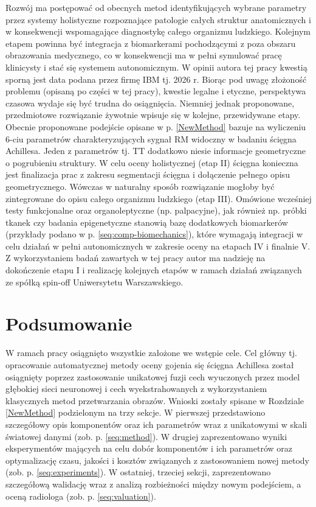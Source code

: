 Rozwój ma postępować od obecnych metod identyfikujących wybrane parametry przez systemy holistyczne rozpoznające patologie całych struktur anatomicznych \linebreak i w konsekwencji wspomagające diagnostykę całego organizmu ludzkiego. Kolejnym etapem powinna być integracja z biomarkerami pochodzącymi z poza obszaru obrazowania medycznego, co w konsekwencji ma w pełni symulować pracę klinicysty i stać się systemem autonomicznym. W opinii autora tej pracy kwestią sporną jest data podana przez firmę IBM tj. 2026 r. Biorąc pod uwagę złożoność problemu (opisaną po części w tej pracy), kwestie legalne i etyczne, perspektywa czasowa wydaje się być trudna do osiągnięcia. Niemniej jednak proponowane, przedmiotowe rozwiązanie żywotnie wpisuje się w kolejne, przewidywane etapy. Obecnie proponowane podejście opisane w p. \ref{NewMethod} bazuje na wyliczeniu 6-ciu parametrów charakteryzujących sygnał RM widoczny w badaniu ścięgna Achillesa. Jeden z parametrów tj. TT dodatkowo niesie informacje geometryczne o pogrubieniu struktury. W celu oceny holistycznej (etap II) ścięgna konieczna jest finalizacja prac z zakresu segmentacji ścięgna i dołączenie pełnego opisu geometrycznego. Wówczas w naturalny sposób rozwiązanie mogłoby być zintegrowane do opisu całego organizmu ludzkiego (etap III). Omówione wcześniej testy funkcjonalne oraz organoleptyczne (np. palpacyjne), jak również np. próbki tkanek czy badania epigenetyczne stanowią bazę dodatkowych biomarkerów (przykłady podano w p. \ref{seq:comp-biomechanics}), które wymagają integracji w celu działań w pełni autonomicznych w zakresie oceny na etapach IV i finalnie V. Z wykorzystaniem badań zawartych w tej pracy autor ma nadzieję na dokończenie etapu I i realizację kolejnych etapów w ramach działań związanych ze spółką spin-off Uniwersytetu Warszawskiego. 

\chapter{Podsumowanie}

W ramach pracy osiągnięto wszystkie założone we wstępie cele. Cel główny tj. opracowanie automatycznej metody oceny gojenia się ścięgna Achillesa został osiągnięty poprzez zastosowanie unikatowej fuzji cech wyuczonych przez model głębokiej sieci neuronowej i cech wyekstrahowanych z wykorzystaniem klasycznych metod przetwarzania obrazów. Wnioski zostały spisane w Rozdziale \ref{NewMethod} podzielonym na trzy sekcje. W pierwszej przedstawiono szczegółowy opis komponentów oraz ich parametrów wraz z unikatowymi w skali światowej danymi (zob. p. \ref{seq:method}). W drugiej zaprezentowano wyniki eksperymentów mających na celu dobór komponentów i ich parametrów oraz optymalizację czasu, jakości i kosztów związanych z zastosowaniem nowej metody (zob. p. \ref{seq:experiments}). W ostatniej, trzeciej sekcji, zaprezentowano szczegółową walidację wraz z analizą rozbieżności między nowym podejściem, a oceną radiologa (zob. p. \ref{seq:valuation}).

